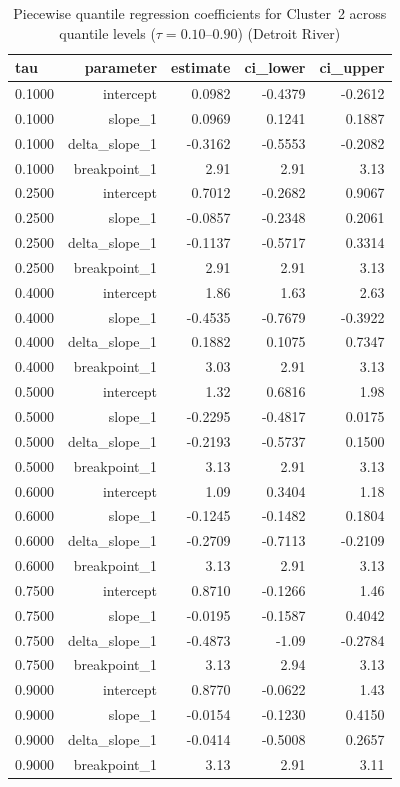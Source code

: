 \begin{table}[htbp]
  \centering
  \caption{Piecewise quantile regression coefficients for Cluster~2 across quantile levels ($\tau = 0.10$--$0.90$) (Detroit River)}
  \label{tab:dr_05_piecewise_qr_qr_coefficients_cluster_2}
  \begin{tabular}{lrrrr}
    \toprule
    tau & parameter & estimate & ci\_lower & ci\_upper \\
    \midrule
    0.1000 & intercept & 0.0982 & -0.4379 & -0.2612 \\
    0.1000 & slope\_1 & 0.0969 & 0.1241 & 0.1887 \\
    0.1000 & delta\_slope\_1 & -0.3162 & -0.5553 & -0.2082 \\
    0.1000 & breakpoint\_1 & 2.91 & 2.91 & 3.13 \\
    0.2500 & intercept & 0.7012 & -0.2682 & 0.9067 \\
    0.2500 & slope\_1 & -0.0857 & -0.2348 & 0.2061 \\
    0.2500 & delta\_slope\_1 & -0.1137 & -0.5717 & 0.3314 \\
    0.2500 & breakpoint\_1 & 2.91 & 2.91 & 3.13 \\
    0.4000 & intercept & 1.86 & 1.63 & 2.63 \\
    0.4000 & slope\_1 & -0.4535 & -0.7679 & -0.3922 \\
    0.4000 & delta\_slope\_1 & 0.1882 & 0.1075 & 0.7347 \\
    0.4000 & breakpoint\_1 & 3.03 & 2.91 & 3.13 \\
    0.5000 & intercept & 1.32 & 0.6816 & 1.98 \\
    0.5000 & slope\_1 & -0.2295 & -0.4817 & 0.0175 \\
    0.5000 & delta\_slope\_1 & -0.2193 & -0.5737 & 0.1500 \\
    0.5000 & breakpoint\_1 & 3.13 & 2.91 & 3.13 \\
    0.6000 & intercept & 1.09 & 0.3404 & 1.18 \\
    0.6000 & slope\_1 & -0.1245 & -0.1482 & 0.1804 \\
    0.6000 & delta\_slope\_1 & -0.2709 & -0.7113 & -0.2109 \\
    0.6000 & breakpoint\_1 & 3.13 & 2.91 & 3.13 \\
    0.7500 & intercept & 0.8710 & -0.1266 & 1.46 \\
    0.7500 & slope\_1 & -0.0195 & -0.1587 & 0.4042 \\
    0.7500 & delta\_slope\_1 & -0.4873 & -1.09 & -0.2784 \\
    0.7500 & breakpoint\_1 & 3.13 & 2.94 & 3.13 \\
    0.9000 & intercept & 0.8770 & -0.0622 & 1.43 \\
    0.9000 & slope\_1 & -0.0154 & -0.1230 & 0.4150 \\
    0.9000 & delta\_slope\_1 & -0.0414 & -0.5008 & 0.2657 \\
    0.9000 & breakpoint\_1 & 3.13 & 2.91 & 3.11 \\
    \bottomrule
  \end{tabular}
\end{table}
